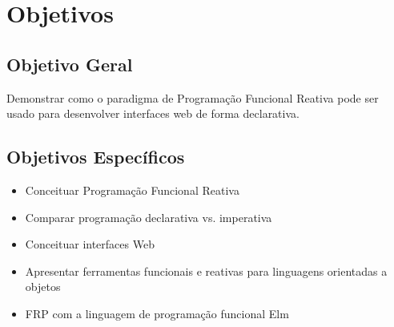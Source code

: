 \section{Objetivos}\label{lobjetivos}

\subsection{Objetivo Geral}
Demonstrar como o paradigma de Programação Funcional Reativa pode ser usado para
desenvolver interfaces web de forma declarativa.

\subsection{Objetivos Específicos}
\begin{itemize}
  \item Conceituar Programação Funcional Reativa
  \item Comparar programação declarativa vs. imperativa
  \item Conceituar interfaces Web
  \item Apresentar ferramentas funcionais e reativas para linguagens orientadas a objetos
  \item FRP com a linguagem de programação funcional Elm
\end{itemize}
